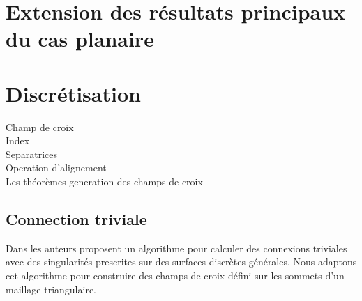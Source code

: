 \section{Extension des résultats principaux du cas planaire}

\section{Discrétisation}

Champ de croix\\
Index\\
Separatrices\\
Operation d'alignement\\
Les théorèmes
generation des champs de croix

\subsection{Connection triviale}

Dans \cite{crane2010trivial, de2010trivial} les auteurs proposent un algorithme pour calculer des connexions triviales avec des singularités prescrites sur des surfaces discrètes générales. Nous adaptons cet algorithme pour construire des champs de croix défini sur les sommets d'un maillage triangulaire.
